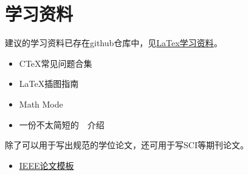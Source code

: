 \chapter{学习资料}
\label{chap:material}

建议的学习资料已存在github仓库中，见\href{https://github.com/BIT-thesis/LaTex-template/tree/master/LaTex%E5%AD%A6%E4%B9%A0%E8%B5%84%E6%96%99}{LaTex学习资料}。

\begin{itemize}
\item C\TeX 常见问题合集
\item \LaTeX 插图指南
\item Math Mode
\item 一份不太简短的~\LaTeXe{}~介绍

\end{itemize}

\LaTex 除了可以用于写出规范的学位论文，还可用于写SCI等期刊论文。

\begin{itemize}
\item \href{http://www.ctan.org/tex-archive/macros/latex/contrib/IEEEtran/}{IEEE­论文模板}

\end{itemize}